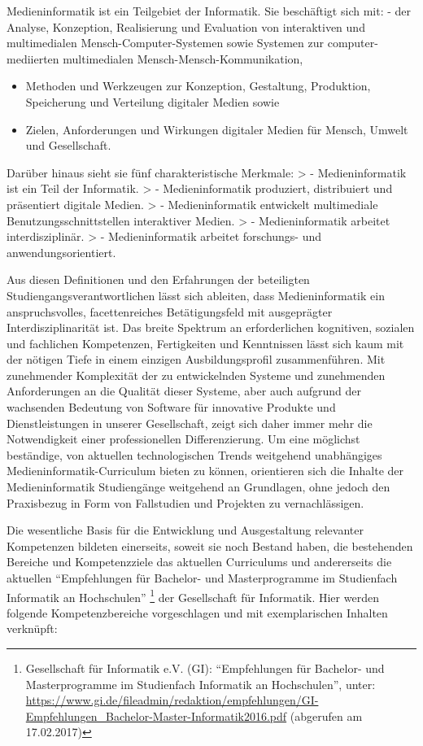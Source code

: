 \begin{siderules}
Medieninformatik ist ein Teilgebiet der Informatik. Sie beschäftigt sich
mit: - der Analyse, Konzeption, Realisierung und Evaluation von
interaktiven und multimedialen Mensch-Computer-Systemen sowie Systemen
zur computer-mediierten multimedialen Mensch-Mensch-Kommunikation,

\begin{itemize}
\tightlist
\item
  Methoden und Werkzeugen zur Konzeption, Gestaltung, Produktion,
  Speicherung und Verteilung digitaler Medien sowie
\item
  Zielen, Anforderungen und Wirkungen digitaler Medien für Mensch,
  Umwelt und Gesellschaft.
\end{itemize}
\end{siderules}

Darüber hinaus sieht sie fünf charakteristische Merkmale: \textgreater{}
- Medieninformatik ist ein Teil der Informatik. \textgreater{} -
Medieninformatik produziert, distribuiert und präsentiert digitale
Medien. \textgreater{} - Medieninformatik entwickelt multimediale
Benutzungsschnittstellen interaktiver Medien. \textgreater{} -
Medieninformatik arbeitet interdisziplinär. \textgreater{} -
Medieninformatik arbeitet forschungs- und anwendungsorientiert.

Aus diesen Definitionen und den Erfahrungen der beteiligten
Studiengangsverantwortlichen lässt sich ableiten, dass Medieninformatik
ein anspruchsvolles, facettenreiches Betätigungsfeld mit ausgeprägter
Interdisziplinarität ist. Das breite Spektrum an erforderlichen
kognitiven, sozialen und fachlichen Kompetenzen, Fertigkeiten und
Kenntnissen lässt sich kaum mit der nötigen Tiefe in einem einzigen
Ausbildungsprofil zusammenführen. Mit zunehmender Komplexität der zu
entwickelnden Systeme und zunehmenden Anforderungen an die Qualität
dieser Systeme, aber auch aufgrund der wachsenden Bedeutung von Software
für innovative Produkte und Dienstleistungen in unserer Gesellschaft,
zeigt sich daher immer mehr die Notwendigkeit einer professionellen
Differenzierung. Um eine möglichst beständige, von aktuellen
technologischen Trends weitgehend unabhängiges
Medieninformatik-Curriculum bieten zu können, orientieren sich die
Inhalte der Medieninformatik Studiengänge weitgehend an Grundlagen, ohne
jedoch den Praxisbezug in Form von Fallstudien und Projekten zu
vernachlässigen.

Die wesentliche Basis für die Entwicklung und Ausgestaltung relevanter
Kompetenzen bildeten einerseits, soweit sie noch Bestand haben, die
bestehenden Bereiche und Kompetenzziele das aktuellen Curriculums und
andererseits die aktuellen ``Empfehlungen für Bachelor- und
Masterprogramme im Studienfach Informatik an Hochschulen'' \footnote{Gesellschaft
  für Informatik e.V. (GI): ``Empfehlungen für Bachelor- und
  Masterprogramme im Studienfach Informatik an Hochschulen'', unter:
  \url{https://www.gi.de/fileadmin/redaktion/empfehlungen/GI-Empfehlungen\_Bachelor-Master-Informatik2016.pdf}
  (abgerufen am 17.02.2017)} der Gesellschaft für Informatik. Hier
werden folgende Kompetenzbereiche vorgeschlagen und mit exemplarischen
Inhalten verknüpft:

